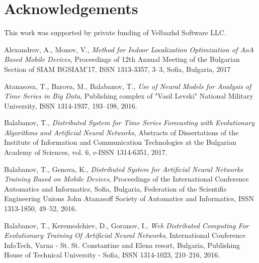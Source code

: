 \documentclass{llncs}
\begin{document}

\section*{Acknowledgements}

This work was supported by private funding of Velbazhd Software LLC.


\begin{thebibliography}{99}

 Alexandrov, A., Monov, V., \textit{Method for Indoor Localization Optimization of AoA Based Mobile Devices}, Proceedings of 12th Annual Meeting of the Bulgarian Section of SIAM BGSIAM’17, ISSN 1313-3357, 3--3, Sofia, Bulgaria, 2017

 Atanasova, T., Barova, M., Balabanov, T., \textit{Use of Neural Models for Analysis of Time Series in Big Data}, Publishing complex of "Vasil Levski" National Military University, ISSN 1314-1937, 193--198, 2016.

 Balabanov, T., \textit{Distributed System for Time Series Forecasting with Evolutionary Algorithms and Artificial Neural Networks}, Abstracts of Dissertations of the Institute of Information and Communication Technologies at the Bulgarian Academy of Sciences, vol. 6, e-ISSN 1314-6351, 2017.

 Balabanov, T., Genova, K., \textit{Distributed System for Artificial Neural Networks Training Based on Mobile Devices}, Proceedings of the International Conference Automatics and Informatics, Sofia, Bulgaria, Federation of the Scientific Engineering Unions John Atanasoff Society of Automatics and Informatics, ISSN 1313-1850, 49--52, 2016.

 Balabanov, T., Keremedchiev, D., Goranov, I., \textit{Web Distributed Computing For Evolutionary Training Of Artificial Neural Networks}, International Conference InfoTech, Varna - St. St. Constantine and Elena resort, Bulgaria, Publishing House of Technical University - Sofia, ISSN 1314-1023, 210--216, 2016.


\end{thebibliography}
\end{document}
